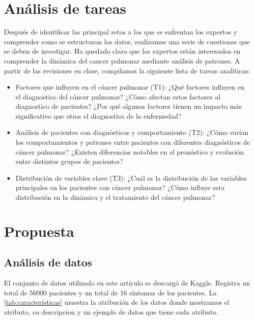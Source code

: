 \documentclass[10pt,journal,compsoc]{IEEEtran}
\begin{document}
\section{Análisis de tareas}
\label{sec:analiticas}
Después de identificar las principal retos a los que se enfrentan los expertos y comprender como se estructuran los datos, realizamos una serie de cuestiones que se deben de investigar. Ha quedado claro que los expertos están interesados en comprender la dinámica del cancer pulmonar mediante análisis de patrones. A partir de las revisiones en clase, compilamos la siguiente lista de tareas analíticas:
\begin{itemize}
\item Factores que influyen en el cáncer pulmonar (T1): ¿Qué factores influyen en el diagnostico del cáncer pulmonar? ¿Cómo afectan estos factores al diagnostico de pacientes? ¿Por qué algunos factores tienen un impacto más significativo que otros el diagnostico de la enfermedad?
\item Análisis de pacientes con diagnósticos y comportamiento (T2): ¿Cómo varían los comportamientos y patrones entre pacientes con diferentes diagnósticos de cáncer pulmonar? ¿Existen diferencias notables en el pronóstico y evolución entre distintos grupos de pacientes?
\item Distribución de variables clave (T3): ¿Cuál es la distribución de las variables principales en los pacientes con cáncer pulmonar? ¿Cómo influye esta distribución en la dinámica y el tratamiento del cáncer pulmonar?
\end{itemize}

\section{Propuesta}

\subsection{Análisis de datos}
El conjunto de datos utilizado en este artículo se descargó de Kaggle. Registra un total de 56000 pacientes y un total de 16 síntomas de los pacientes. La \autoref{tab:caracteristicas}   muestra la atribución de los datos donde mostramos el atributo, su descripcion y un ejemplo de datos que tiene cada atributo.
\end{document}
